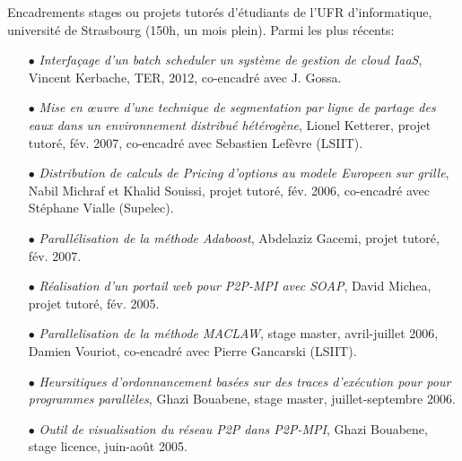 \documentclass[11pt]{article}
\begin{document}
\label{sc:encadre-autres} 
Encadrements stages ou projets tutorés d'étudiants de l'UFR d'informatique, 
université de Strasbourg (150h, un mois plein). Parmi les plus récents:
\smallskip
\begin{itemize}
\item[$\bullet$]  {\it Interfaçage d'un batch scheduler un système de gestion 
de cloud IaaS}, Vincent Kerbache, TER, 2012, co-encadré avec J. Gossa. 
\item[$\bullet$]  {\it Mise en {\oe}uvre d'une technique de segmentation par 
ligne de partage des eaux dans un environnement distribué hétérogène}, 
Lionel Ketterer, projet tutoré, fév. 2007, co-encadré avec Sebastien 
Lefèvre (LSIIT).
\item[$\bullet$]  {\it Distribution de calculs de Pricing d'options au modele 
Europeen sur grille}, Nabil Michraf et Khalid Souissi, projet tutoré, fév. 2006, 
co-encadré avec Stéphane Vialle (Supelec).

\item[$\bullet$]  {\it Parallélisation de la méthode Adaboost}, Abdelaziz 
Gacemi, projet tutoré, fév. 2007.
\item[$\bullet$] {\it Réalisation d'un portail web pour P2P-MPI avec SOAP}, 
David Michea, projet tutoré, fév. 2005.

\item[$\bullet$] {\it Parallelisation de la méthode MACLAW}, stage master, 
avril-juillet 2006, Damien Vouriot, co-encadré avec Pierre Gancarski (LSIIT).
\item[$\bullet$] {\it Heursitiques d'ordonnancement basées sur des traces 
d'exécution pour pour programmes parallèles}, Ghazi Bouabene, stage master, 
juillet-septembre 2006.
\item[$\bullet$]  {\it Outil de visualisation du réseau P2P dans P2P-MPI}, 
Ghazi Bouabene, stage licence, juin-août 2005.
\end{itemize}
\end{document}
